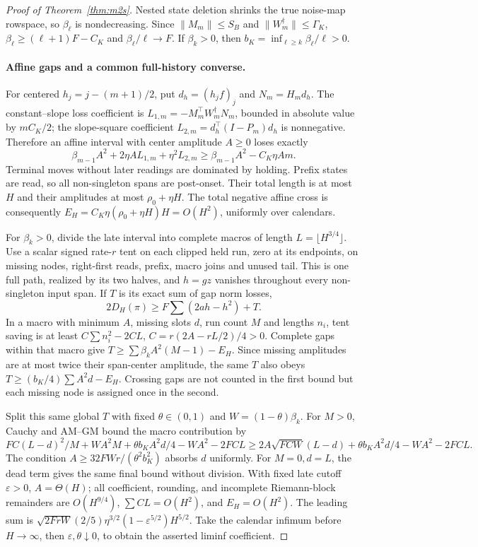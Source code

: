 \documentclass[11pt]{article}
\begin{document}
\begin{proof}[Proof of Theorem~\ref{thm:m2s}]
Nested state deletion shrinks the true noise-map rowspace, so
$\beta_\ell$ is nondecreasing. Since $\|M_m\|\le S_B$ and
$\|W_m^\dagger\|\le\Gamma_K$,
$\beta_\ell\ge(\ell+1)F-C_K$ and $\beta_\ell/\ell\to F$.
If $\beta_k>0$, then $b_K=\inf_{\ell\ge k}\beta_\ell/\ell>0$.

\paragraph{Affine gaps and a common full-history converse.}
For centered $h_j=j-(m+1)/2$, put $d_h=(h_jf)_j$ and
$N_m=H_md_h$.
The constant--slope loss coefficient is
$L_{1,m}=-M_m^\top W_m^\dagger N_m$, bounded in absolute value by $mC_K/2$;
the slope-square coefficient $L_{2,m}=d_h^\top(I-P_m)d_h$ is nonnegative.
Therefore an affine interval with center amplitude $A\ge0$ loses exactly
\[
\beta_{m-1}A^2+2\eta A L_{1,m}+\eta^2L_{2,m}
\ge\beta_{m-1}A^2-C_K\eta A m.
\]
Terminal moves without later readings are dominated by holding.
Prefix states are read, so all non-singleton spans are post-onset.
Their total length is at most $H$ and their amplitudes at most
$\rho_0+\eta H$. The total negative affine cross is consequently
$E_H=C_K\eta(\rho_0+\eta H)H=O(H^2)$, uniformly over calendars.

For $\beta_k>0$, divide the late interval into complete macros
of length $L=\lfloor H^{3/4}\rfloor$.
Use a scalar signed rate-$r$ tent on each clipped held run, zero at its
endpoints, on missing nodes, right-first reads, prefix, macro joins and unused tail.
This is one full path, realized by its two halves, and $h=gz$ vanishes
throughout every non-singleton input span.
If $T$ is its exact sum of gap norm losses,
\[
2D_H(\pi)\ge F\sum(2ah-h^2)+T.
\]
In a macro with minimum $A$, missing slots $d$, run count $M$ and lengths $n_i$,
tent saving is at least $C\sum n_i^2-2CL$,
$C=r(2A-rL/2)/4>0$.
Complete gaps within that macro give
$T\ge\sum\beta_kA^2(M-1)-E_H$.
Since missing amplitudes are at most twice their span-center amplitude,
the same $T$ also obeys $T\ge(b_K/4)\sum A^2d-E_H$.
Crossing gaps are not counted in the first bound but each missing node is
assigned once in the second.

Split this same global $T$ with fixed $\theta\in(0,1)$ and
$W=(1-\theta)\beta_k$. For $M>0$, Cauchy and AM--GM bound the macro contribution by
\[
FC(L-d)^2/M+WA^2M+\theta b_KA^2d/4-WA^2-2FCL
\ge2A\sqrt{FCW}(L-d)+\theta b_KA^2d/4-WA^2-2FCL .
\]
The condition $A\ge32FWr/(\theta^2b_K^2)$ absorbs $d$ uniformly.
For $M=0,d=L$, the dead term gives the same final bound without division.
With fixed late cutoff $\varepsilon>0$, $A=\Theta(H)$;
all coefficient, rounding, and incomplete Riemann-block remainders are
$O(H^{9/4})$, $\sum CL=O(H^2)$, and $E_H=O(H^2)$.
The leading sum is
$\sqrt{2FrW}(2/5)\eta^{3/2}(1-\varepsilon^{5/2})H^{5/2}$.
Take the calendar infimum before $H\to\infty$, then
$\varepsilon,\theta\downarrow0$, to obtain the asserted liminf coefficient.


\end{proof}
\end{document}
